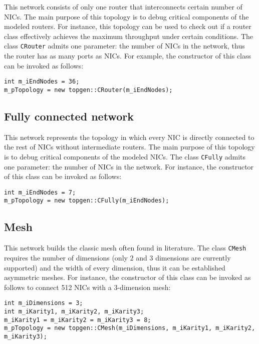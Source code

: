 \documentclass[12pt,onecolumn]{report}
\begin{document}
This network consists of only one router that interconnects certain number of NICs. The main purpose of this topology is to debug critical components of the modeled routers. For instance, this topology can be used to check out if a router class effectively achieves the maximum throughput under certain conditions. The class \verb|CRouter| admits one parameter: the number of NICs in the network, thus the router has as many ports as NICs. For example, the constructor of this class can be invoked as follows:

\begin{lstlisting}
int m_iEndNodes = 36;
m_pTopology = new topgen::CRouter(m_iEndNodes);
\end{lstlisting}

\subsection*{Fully connected network}

This network represents the topology in which every NIC is directly connected to the rest of NICs without intermediate routers. The main purpose of this topology is to debug critical components of the modeled NICs. The class \verb|CFully| admits one parameter: the number of NICs in the network. For instance, the constructor of this class can be invoked as follows:

\begin{lstlisting}
int m_iEndNodes = 7;
m_pTopology = new topgen::CFully(m_iEndNodes);
\end{lstlisting}

\subsection*{Mesh}

This network builds the classic mesh often found in literature. The class \verb|CMesh| requires the number of dimensions (only 2 and 3 dimensions are currently supported) and the width of every dimension, thus it can be established asymmetric meshes. For instance, the constructor of this class can be invoked as follows to connect 512 NICs with a 3-dimension mesh:

\begin{lstlisting}
int m_iDimensions = 3;
int m_iKarity1, m_iKarity2, m_iKarity3;
m_iKarity1 = m_iKarity2 = m_iKarity3 = 8;
m_pTopology = new topgen::CMesh(m_iDimensions, m_iKarity1, m_iKarity2, m_iKarity3);
\end{lstlisting}
\end{document}
